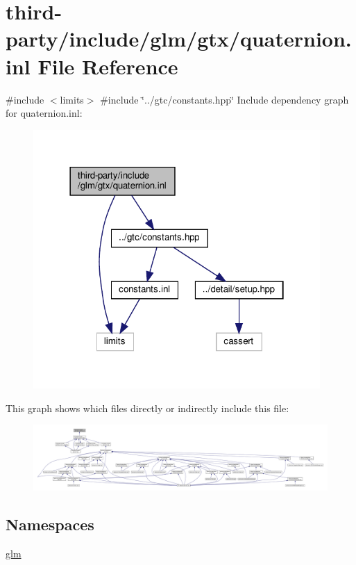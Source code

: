 \hypertarget{gtx_2quaternion_8inl}{}\section{third-\/party/include/glm/gtx/quaternion.inl File Reference}
\label{gtx_2quaternion_8inl}
{\ttfamily \#include $<$limits$>$}\newline
{\ttfamily \#include \char`\"{}../gtc/constants.\+hpp\char`\"{}}\newline
Include dependency graph for quaternion.\+inl\+:
\nopagebreak
\begin{figure}[H]
\begin{center}
\leavevmode
\includegraphics[width=310pt]{gtx_2quaternion_8inl__incl}
\end{center}
\end{figure}
This graph shows which files directly or indirectly include this file\+:
\nopagebreak
\begin{figure}[H]
\begin{center}
\leavevmode
\includegraphics[width=350pt]{gtx_2quaternion_8inl__dep__incl}
\end{center}
\end{figure}
\subsection*{Namespaces}
\begin{DoxyCompactItemize}
\item 
 \hyperlink{namespaceglm}{glm}
\end{DoxyCompactItemize}
